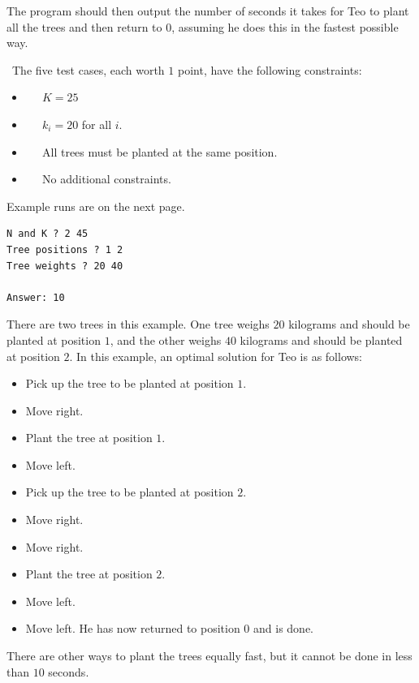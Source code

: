 The program should then output the number of seconds it takes for Teo to plant all the trees and then return to $0$, assuming he does this in the fastest possible way.

\vspace{0.5cm}
\
The five test cases, each worth $1$ point, have the following constraints:
\begin{itemize}
\item[(1)] $\;\;\;\;$ $K=25$
\item[(2)] $\;\;\;\;$ $k_i = 20$ for all $i$.
\item[(3)] $\;\;\;\;$ All trees must be planted at the same position.
\item[(4-5)] $\;\;\;\;$ No additional constraints.
\end{itemize}

\vspace{1cm}

\begin{center}
{\LARGE Example runs are on the next page.}
\end{center}

\newpage

\begin{verbatim}
N and K ? 2 45
Tree positions ? 1 2
Tree weights ? 20 40

Answer: 10
\end{verbatim}
 There are two trees in this example.
One tree weighs $20$ kilograms and should be planted at position $1$, and the other weighs $40$ kilograms and should be planted at position $2$.
In this example, an optimal solution for Teo is as follows:
\begin{itemize}
\item Pick up the tree to be planted at position $1$.
\item Move right.
\item Plant the tree at position $1$.
\item Move left.
\item Pick up the tree to be planted at position $2$.
\item Move right.
\item Move right.
\item Plant the tree at position $2$.
\item Move left.
\item Move left. He has now returned to position $0$ and is done.
\end{itemize}
There are other ways to plant the trees equally fast, but it cannot be done in
less than $10$ seconds.

